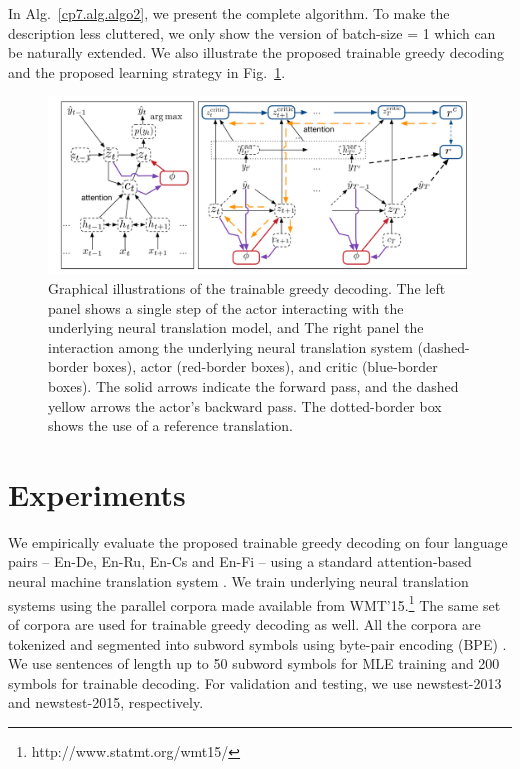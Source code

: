 In Alg.~\ref{cp7.alg.algo2}, we present the complete algorithm. To make the description less cluttered, we only show the version of batch-size = 1 which can be naturally extended. We also illustrate the proposed trainable greedy decoding and the proposed learning strategy in Fig.~\ref{cp7.fig.tgd}.

\begin{figure}[t]
\centering
\includegraphics[width=\columnwidth]{figs/trainable/framework.pdf}
\caption{\label{cp7.fig.tgd}  
Graphical illustrations of the trainable greedy decoding. The left panel shows a single step of the actor interacting with the underlying neural translation model, and The right panel the interaction among the underlying neural translation system (dashed-border boxes), actor (red-border boxes), and critic (blue-border boxes). The solid arrows indicate the forward pass, and the dashed yellow arrows the actor's backward pass. The dotted-border box shows the use of a reference translation.}
\end{figure}






\section{Experiments}

We empirically evaluate the proposed trainable greedy decoding on four language pairs -- En-De, En-Ru, En-Cs and En-Fi -- using a standard attention-based neural machine translation system \citep{bahdanau2014neural}. We train underlying neural translation systems using the parallel corpora made available from WMT'15.\footnote{http://www.statmt.org/wmt15/} The same set of corpora are used for trainable greedy decoding as well. All the corpora are tokenized and segmented into subword symbols using byte-pair encoding (BPE) \citep{sennrich2015neural}. We use sentences of length up to 50 subword symbols for MLE training and 200 symbols for trainable decoding. For validation and testing, we use newstest-2013 and newstest-2015, respectively.



